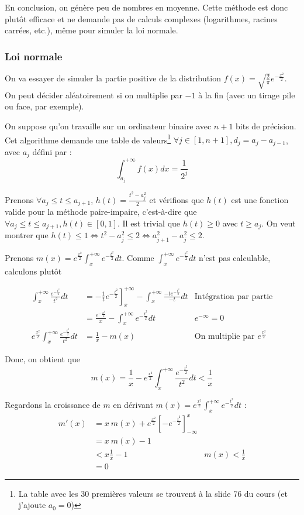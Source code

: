 En conclusion, on génère peu de nombres en moyenne. Cette méthode est donc plutôt efficace et ne demande pas de calculs complexes (logarithmes, racines carrées, etc.), même pour simuler la loi normale.

\subsubsection{Loi normale}
On va essayer de simuler la partie positive de la distribution $f(x) = \sqrt{\frac{2}{\pi}} e^{-\frac{x^2}{2}}$. On peut décider aléatoirement si on multiplie par $-1$ à la fin (avec un tirage pile ou face, par exemple).

On suppose qu'on travaille sur un ordinateur binaire avec $n + 1$ bits de précision. Cet algorithme demande une table de valeurs\footnote{La table avec les 30 premières valeurs se trouvent à la slide 76 du cours (et j'ajoute $a_0 = 0$)} $\forall j \in [1,n+1], d_j = a_j - a_{j-1}$, avec $a_j$ défini par :
$$\int_{a_j}^{+\infty} f(x)dx = \frac{1}{2^j}$$

Prenons $\forall a_j \leq t \leq a_{j+1}$, $h(t) = \frac{t^2 - a_j^2}{2}$ et vérifions que $h(t)$ est une fonction valide pour la méthode paire-impaire, c'est-à-dire que $\forall a_j \leq t \leq a_{j+1}, h(t) \in [0, 1]$. Il est trivial que $h(t) \geq 0$ avec $t \geq a_j$. On veut montrer que $h(t) \leq 1 \iff t^2-a_j^2 \leq 2 \iff a_{j+1}^2 - a_j^2 \leq 2$.

Prenons $m(x) = e^{\frac{x^2}{2}} \int_x^{+\infty} e^{-\frac{t^2}{2}} dt$. Comme $\int_x^{+\infty}e^{-\frac{t^2}{2}} dt$ n'est pas calculable, calculons plutôt

\begin{align*}
    \int_x^{+\infty} \frac{e^{-\frac{t^2}{2}}}{t^2} dt
    & = \left.- \frac{1}{t}e^{-\frac{t^2}{2}}\right]_x^{+\infty} - \int_x^{+\infty}\frac{-t e^{-\frac{t^2}{2}}}{-t} dt & \text{Intégration par partie} \\
    & = \frac{e^{-\frac{x^2}{2}}}{x} - \int_x^{+\infty}e^{-\frac{t^2}{2}} dt & \text{$e^{-\infty}=0$}\\
    e^{\frac{x^2}{2}} \int_x^{+\infty} \frac{e^{-\frac{t^2}{2}}}{t^2} dt & = \frac{1}{x} - m(x) & \text{On multiplie par $e^{\frac{x^2}{2}}$}
\end{align*}

Donc, on obtient que
$$m(x) = \frac{1}{x} - e^{\frac{x^2}{2}} \int_x^{+\infty}\frac{e^{-\frac{t^2}{2}}}{t^2} dt < \frac{1}{x}$$

Regardons la croissance de $m$ en dérivant $m(x) = e^\frac{x^2}{2}\int_x^{+\infty}e^{-\frac{t^2}{2}}dt$ :
\begin{align*}
    m'(x) & = x\ m(x) + e^\frac{x^2}{2} \left[ -e^{-\frac{t^2}{2}} \right]_{-\infty}^x \\
    & = x\ m(x) - 1 \\
    & < x\frac{1}{x} - 1 & \text{$m(x) < \frac{1}{x}$}\\
    & = 0
\end{align*}


